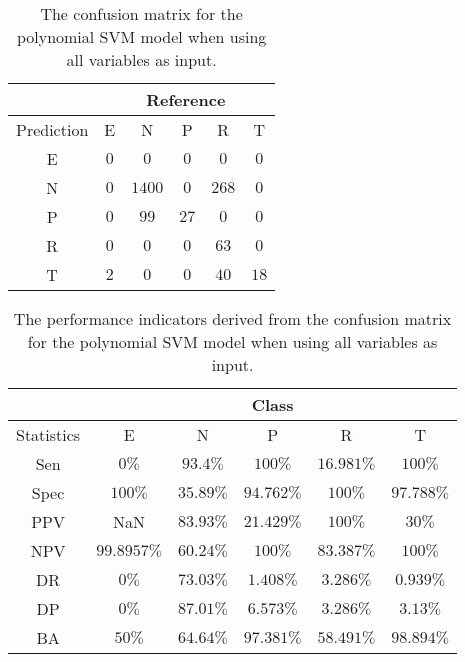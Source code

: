 \begin{table}[!ht]
	\centering
	\begin{tabular}{|c|c|c|c|c|c|}
		\hline
		 & \multicolumn{5}{|c|}{Reference} \\ \hline
		 Prediction & E & N & P & R & T \\ \hline
		 E & $0$ & $0$ & $0$ & $0$ & $0$ \\ \hline
		 N & $0$ & $1400$ & $0$ & $268$ & $0$ \\ \hline
		 P & $0$ & $99$ & $27$ & $0$ & $0$ \\ \hline
		 R & $0$ & $0$ & $0$ & $63$ & $0$ \\ \hline
		 T & $2$ & $0$ & $0$ & $40$ & $18$ \\ \hline
	\end{tabular}
	\caption{The confusion matrix for the polynomial SVM model when using all variables as input.}
	\label{tab:cm:all:svmPoly}
\end{table}

\begin{table}[!ht]
	\centering
	\begin{tabular}{|c|c|c|c|c|c|}
		\hline
		 & \multicolumn{5}{c|}{Class} \\ \hline
		Statistics & E & N & P & R & T \\ \hline
		Sen & $0\%$ & $93.4\%$ & $100\%$ & $16.981\%$ & $100\%$ \\ \hline
		Spec & $100\%$ & $35.89\%$ & $94.762\%$ & $100\%$ & $97.788\%$ \\ \hline
		PPV & NaN & $83.93\%$ & $21.429\%$ & $100\%$ & $30\%$ \\ \hline
		NPV & $99.8957\%$ & $60.24\%$ & $100\%$ & $83.387\%$ & $100\%$ \\ \hline
		DR & $0\%$ & $73.03\%$ & $1.408\%$ & $3.286\%$ & $0.939\%$ \\ \hline
		DP & $0\%$ & $87.01\%$ & $6.573\%$ & $3.286\%$ & $3.13\%$ \\ \hline
		BA & $50\%$ & $64.64\%$ & $97.381\%$ & $58.491\%$ & $98.894\%$ \\ \hline
	\end{tabular}
	\caption{The performance indicators derived from the confusion matrix for the polynomial SVM model when using all variables as input.}
	\label{tab:cs:reverse:all:svmPoly}
\end{table}

